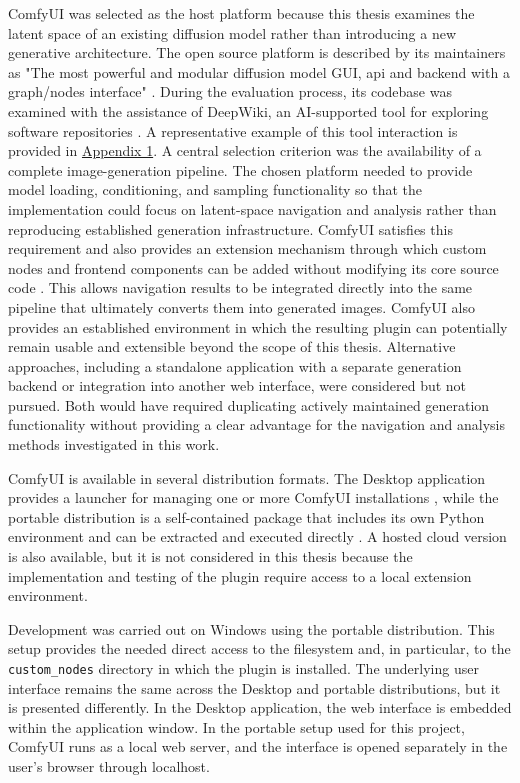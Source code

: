 ComfyUI was selected as the host platform because this thesis examines the latent space of an existing diffusion model rather than introducing a new generative architecture. The open source platform is described by its maintainers as "The most powerful and modular diffusion model GUI, api and backend with a graph/nodes interface" \cite{comfyorg2026github}. During the evaluation process, its codebase was examined with the assistance of DeepWiki, an AI-supported tool for exploring software repositories \cite{deepwiki2026tool}. A representative example of this tool interaction is provided in \hyperref[app:1-comfyui]{Appendix 1}.
A central selection criterion was the availability of a complete image-generation pipeline. The chosen platform needed to provide model loading, conditioning, and sampling functionality so that the implementation could focus on latent-space navigation and analysis rather than reproducing established generation infrastructure. ComfyUI satisfies this requirement and also provides an extension mechanism through which custom nodes and frontend components can be added without modifying its core source code \cite{comfyorg2026overview}. This allows navigation results to be integrated directly into the same pipeline that ultimately converts them into generated images.
ComfyUI also provides an established environment in which the resulting plugin can potentially remain usable and extensible beyond the scope of this thesis. Alternative approaches, including a standalone application with a separate generation backend or integration into another web interface, were considered but not pursued. Both would have required duplicating actively maintained generation functionality without providing a clear advantage for the navigation and analysis methods investigated in this work.

ComfyUI is available in several distribution formats. The Desktop application provides a launcher for managing one or more ComfyUI installations \cite{comfyorg2026desktop}, while the portable distribution is a self-contained package that includes its own Python environment and can be extracted and executed directly \cite{comfyorg2026portable}. A hosted cloud version is also available, but it is not considered in this thesis because the implementation and testing of the plugin require access to a local extension environment.

Development was carried out on Windows using the portable distribution. This setup provides the needed direct access to the filesystem and, in particular, to the \texttt{custom\_nodes} directory in which the plugin is installed. The underlying user interface remains the same across the Desktop and portable distributions, but it is presented differently. In the Desktop application, the web interface is embedded within the application window. In the portable setup used for this project, ComfyUI runs as a local web server, and the interface is opened separately in the user's browser through localhost.


